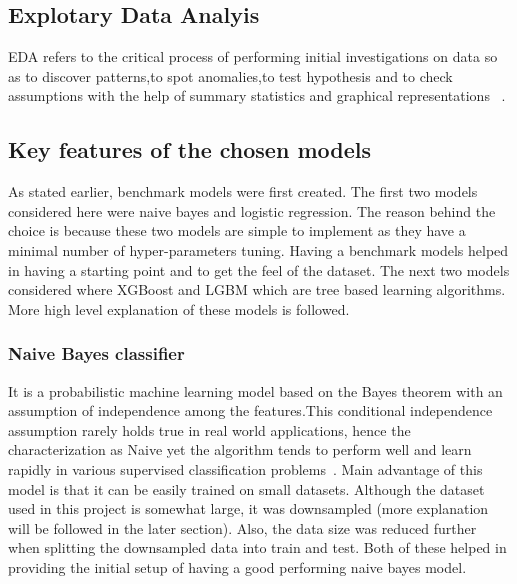 \documentclass[journal,twoside,web]{ieeecolor}
\begin{document}




\subsection{Explotary Data Analyis}
EDA refers to the critical process of performing initial investigations on data so as to discover patterns,to spot anomalies,to test hypothesis and to check assumptions with the help of summary statistics and graphical representations ~\cite{patil_patil_2018}.




\subsection{Key features of the chosen models}
As stated earlier, benchmark models were first created. The first two models considered here were naive bayes and logistic regression. The reason behind the choice is because these two models are simple to implement as they have a minimal number of hyper-parameters tuning. Having a benchmark models helped in having a starting point and to get the feel of the dataset. The next two models considered where XGBoost and LGBM which are tree based learning algorithms. More high level explanation of these models is followed.  
                        
\subsubsection{Naive Bayes classifier}
It is a probabilistic machine learning model based on the Bayes theorem with an assumption of independence among the features.This  conditional independence  assumption  rarely  holds  true  in  real world  applications,  hence  the  characterization  as Naive yet the algorithm tends to perform well and learn  rapidly  in  various  supervised classification problems~\cite{dimitoglou2012comparison}. Main advantage of this model is that it can be easily trained on small datasets. Although the dataset used in this project is somewhat large, it was downsampled (more explanation will be followed in the later section). Also, the data size was reduced further when splitting the downsampled data into train and test. Both of these helped in providing the initial setup of having a good performing naive bayes model. 
\end{document}
